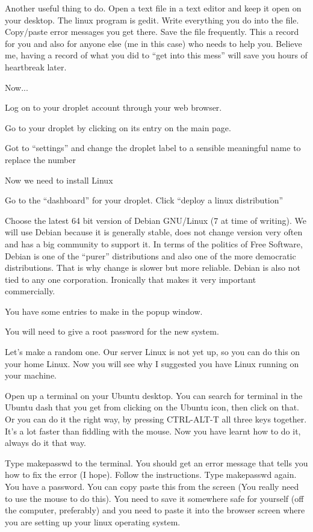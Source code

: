 \documentclass[12pt,a4paper]{article}
\begin{document}
Another useful thing to do. Open a text file in a text editor and keep it open on your desktop. The linux program is gedit. Write everything you do into the file. Copy/paste error messages you get there. Save the file frequently. This a record for you and also for anyone else (me in this case) who needs to help you. Believe me, having a record of what you did to “get into this mess” will save you hours of heartbreak later. 

Now...

Log on to your droplet account through your web browser.

Go to your droplet by clicking on its entry on the main page.

Got to “settings” and change the droplet label to a sensible meaningful name to replace the number

Now we need to install Linux 

Go to the “dashboard” for your droplet. Click “deploy a linux distribution”

Choose the latest 64 bit version of Debian GNU/Linux (7 at time of writing). We will use Debian because it is generally stable, does not change version very often and has a big community to support it.  In terms of the politics of Free Software, Debian is one of the “purer” distributions and also one of the more democratic distributions. That is why change is slower but more reliable. Debian is also not tied to any one corporation. Ironically that makes it very important commercially.

You have some entries to make in the popup window.

You will need to give a root password for the new system. 

Let’s make a random one. Our server Linux is not yet up, so you can do this on your home Linux. Now you will see why I suggested you have Linux running on your machine.

Open up a terminal on your Ubuntu desktop. You can search for terminal in the Ubuntu dash that you get from clicking on the Ubuntu icon, then click on that. Or you can do it the right way, by pressing CTRL-ALT-T all three keys together. It’s a lot faster than fiddling with the mouse. Now you have learnt how to do it, always do it that way.  

Type makepasswd to the terminal. You should get an error message that tells you how to fix the error (I hope). Follow the instructions. Type makepasswd again. You have a password. You can copy paste this from the screen (You really need to use the mouse to do this). You need to save it somewhere safe for yourself (off the computer, preferably) and you need to paste it into the browser screen where you are setting up your linux operating system.
\end{document}

